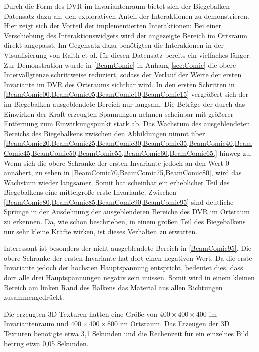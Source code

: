 \documentclass[a4paper,fontsize=12pt,toc=bib,parskip=half,ngerman]{scrartcl}
\begin{document}
Durch die Form des DVR im Invariantenraum bietet sich der Biegebalken-Datensatz dazu an, den explorativen Anteil der Interaktionen zu demonstrieren. Hier zeigt sich der Vorteil der implementierten Interaktionen: Bei einer Verschiebung des Interaktionswidgets wird der angezeigte Bereich im Ortsraum direkt angepasst. Im Gegensatz dazu ben\"otigten die Interakionen in der Visualisierung von Raith et al. f\"ur diesen Datensatz bereits ein vielfaches l\"anger. Zur Demonstration wurde in \cref{BeamComic} in Anhang \ref{sec:Comic} die obere Intervallgrenze schrittweise reduziert, sodass der Verlauf der Werte der ersten Invariante im DVR des Ortsraums sichtbar wird. In den ersten Schritten in \cref{BeamComic00,BeamComic05,BeamComic10,BeamComic15} vergr\"o{\ss}ert sich der im Biegebalken ausgeblendete Bereich nur langsam. Die Betr\"age der durch das Einwirken der Kraft erzeugten Spannungen nehmen scheinbar mit gr\"o{\ss}erer Entfernung zum Einwirkungspunkt stark ab. Das Wachstum des ausgeblendeten Bereichs des Biegebalkens zwischen den Abbildungen nimmt \"uber \cref{BeamComic20,BeamComic25,BeamComic30,BeamComic35,BeamComic40,BeamComic45,BeamComic50,BeamComic55,BeamComic60,BeamComic65,} hinweg zu. Wenn sich die obere Schranke der ersten Invariante jedoch an den Wert 0 ann\"ahert, zu sehen in \cref{BeamComic70,BeamComic75,BeamComic80}, wird das Wachstum wieder langsamer. Somit hat scheinbar ein erheblicher Teil des Biegebalkens eine mittelgro{\ss}e erste Invariante. Zwischen \cref{BeamComic80,BeamComic85,BeamComic90,BeamComic95} sind deutliche Spr\"unge in der Ausdehnung der ausgeblendeten Bereiche des DVR im Ortsraum zu erkennen. Da, wie schon beschrieben, in einem gro{\ss}en Teil des Biegebalkens nur sehr kleine Kr\"afte wirken, ist dieses Verhalten zu erwarten.

Interessant ist besonders der nicht ausgeblendete Bereich in \cref{BeamComic95}. Die obere Schranke der ersten Invariante hat dort einen negativen Wert. Da die erste Invariante jedoch der h\"ochsten Hauptspannung entspricht, bedeutet dies, dass dort alle drei Hauptspannungen negativ sein m\"ussen. Somit wird in einem kleinen Bereich am linken Rand des Balkens das Material aus allen Richtungen zusammengedr\"uckt.

Die erzeugten 3D Texturen hatten eine Gr\"o{\ss}e von $400\times400\times400$ im Invariantenraum und $400\times400\times800$ im Ortsraum. Das Erzeugen der 3D Texturen ben\"otigte etwa 3,1 Sekunden und die Rechenzeit f\"ur ein einzelnes Bild betrug etwa 0,05 Sekunden.
\end{document}
